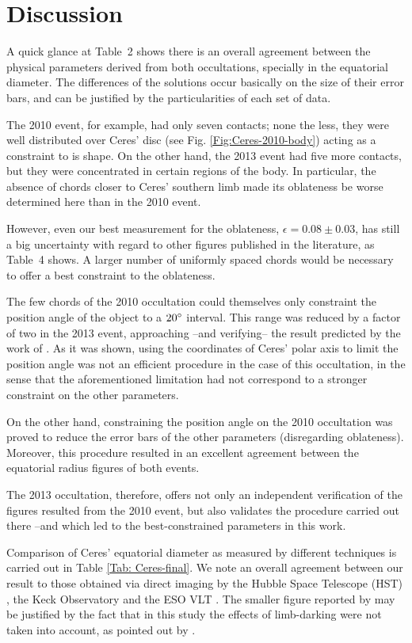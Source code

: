 \documentclass[useAMS,usenatbib]{mn2e}
\begin{document}
\section{Discussion}

A quick glance at Table~2 shows there is an overall agreement between the physical parameters derived from both occultations, specially in the equatorial diameter. The differences of the solutions occur basically on the size of their error bars, and can be justified by the particularities of each set of data.

The 2010 event, for example, had only seven contacts; none the less, they were well distributed over Ceres' disc (see Fig. \ref{Fig:Ceres-2010-body}) acting as a constraint to is shape. On the other hand, the 2013 event had five more contacts, but they were concentrated in certain regions of the body. In particular, the absence of chords closer to Ceres' southern limb made its oblateness be worse determined here than in the 2010 event.

However, even our best measurement for the oblateness, $\epsilon=0.08 \pm 0.03$, has still a big uncertainty with regard to other figures published in the literature, as Table~4 shows. A larger number of uniformly spaced chords would be necessary to offer a best constraint to the oblateness.

The few chords of the 2010 occultation could themselves only constraint the position angle of the object to a $20\hbox{$^\circ$}$ interval. This range was reduced by a factor of two in the 2013 event, approaching --and verifying-- the result predicted by the work of \cite{Drummond2014}. As it was shown, using the coordinates of Ceres' polar axis to limit the position angle was not an efficient procedure in the case of this occultation, in the sense that the aforementioned limitation had not correspond to a stronger constraint on the other parameters.

On the other hand, constraining the position angle on the 2010 occultation was proved to reduce the error bars of the other parameters (disregarding oblateness). Moreover, this procedure resulted in an excellent agreement between the equatorial radius figures of both events.

The 2013 occultation, therefore, offers not only an independent verification of the figures resulted from the 2010 event, but also validates the procedure carried out there --and which led to the best-constrained parameters in this work.

Comparison of Ceres' equatorial diameter as measured by different techniques is carried out in Table \ref{Tab: Ceres-final}. We note an overall agreement between our result to those obtained via direct imaging by the Hubble Space Telescope (HST) \citep{Thomas2005}, the Keck Observatory and the ESO VLT \citep{Drummond2014}. The smaller figure reported by \cite{Carry2008} may be justified by the fact that in this study the effects of limb-darking were not taken into account, as pointed out by \cite{Drummond2014}.
\end{document}

